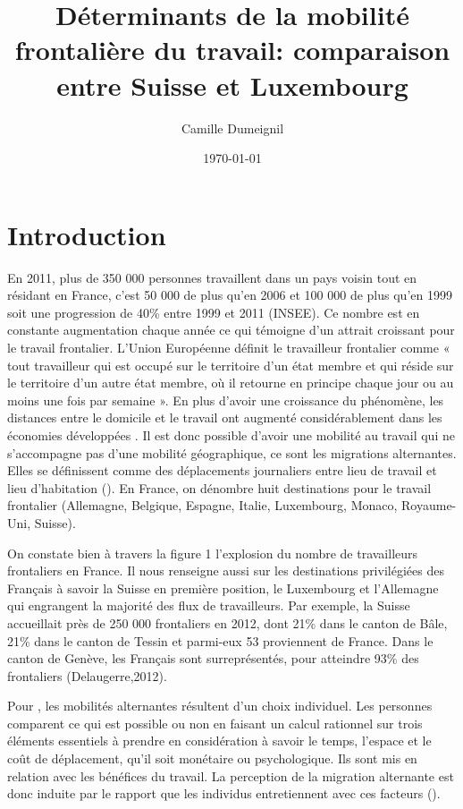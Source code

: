 \documentclass[12pt]{article}
\title{Déterminants de la mobilité frontalière du travail: comparaison entre Suisse et Luxembourg}
\author{Camille Dumeignil}
\date{\today}
\begin{document}
\maketitle
\tableofcontents %


\section{Introduction}

En 2011, plus de 350 000 personnes travaillent dans un pays voisin tout en résidant en France, c’est 50 000 de plus qu’en 2006 et 100 000 de plus qu’en 1999 soit une progression de 40\% entre 1999 et 2011 (INSEE). Ce nombre est en constante augmentation chaque année ce qui témoigne d’un attrait croissant pour le travail frontalier. L’Union Européenne définit le travailleur frontalier comme « tout travailleur qui est occupé sur le territoire d’un état membre et qui réside sur le territoire d’un autre état membre, où il retourne en principe chaque jour ou au moins une fois par semaine ». En plus d’avoir une croissance du phénomène, les distances entre le domicile et le travail ont augmenté considérablement dans les économies développées \cite{Rouwendal1999}. Il est donc possible d’avoir une mobilité au travail qui ne s’accompagne pas d’une mobilité géographique, ce sont les migrations alternantes. Elles se définissent comme des déplacements journaliers entre lieu de travail et lieu d’habitation (\cite{Mougenot1985}). En France, on dénombre huit destinations pour le travail frontalier (Allemagne, Belgique, Espagne, Italie, Luxembourg, Monaco, Royaume-Uni, Suisse).

On constate bien à travers la figure 1 l’explosion du nombre de travailleurs frontaliers en France. Il nous renseigne aussi sur les destinations privilégiées des Français à savoir la Suisse en première position, le Luxembourg et l’Allemagne qui engrangent la majorité des flux de travailleurs. Par exemple, la Suisse accueillait près de 250 000 frontaliers en 2012, dont 21\% dans le canton de Bâle, 21\% dans le canton de Tessin et parmi-eux 53 proviennent de France. Dans le canton de Genève, les Français sont surreprésentés, pour atteindre 93\%  des frontaliers (Delaugerre,2012). 

Pour \cite{Mougenot1985}, les mobilités alternantes résultent d’un choix individuel. Les personnes comparent ce qui est possible ou non en faisant un calcul rationnel sur trois éléments essentiels à prendre en considération à savoir le temps, l’espace et le coût de déplacement, qu’il soit monétaire ou psychologique. Ils sont mis en relation avec les bénéfices du travail. La perception de la migration alternante est donc induite par le rapport que les individus entretiennent avec ces facteurs (\cite{Mougenot1985}). 
\end{document}
